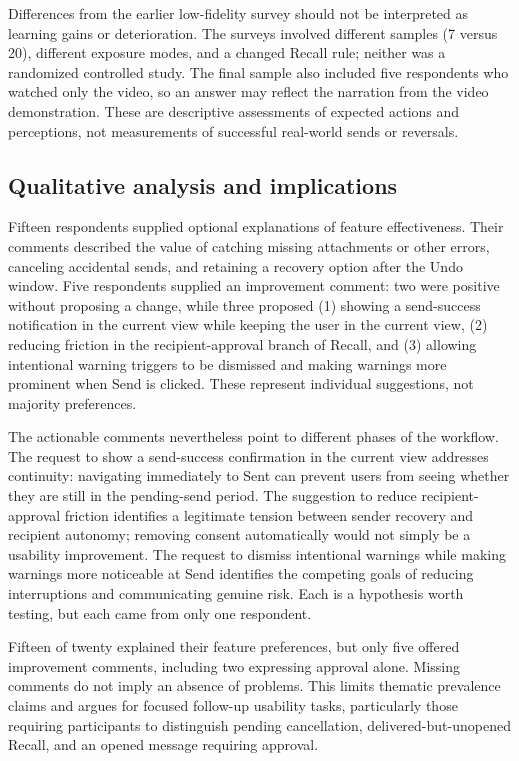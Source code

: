 \documentclass[letterpaper]{jdf}
\begin{document}
Differences from the earlier low-fidelity survey should not be interpreted as learning gains or deterioration. The surveys involved different samples (7 versus 20), different exposure modes, and a changed Recall rule; neither was a randomized controlled study. The final sample also included five respondents who watched only the video, so an answer may reflect the narration from the video demonstration. These are descriptive assessments of expected actions and perceptions, not measurements of successful real-world sends or reversals.

\subsection{Qualitative analysis and implications}
Fifteen respondents supplied optional explanations of feature effectiveness. Their comments described the value of catching missing attachments or other errors, canceling accidental sends, and retaining a recovery option after the Undo window. Five respondents supplied an improvement comment: two were positive without proposing a change, while three proposed (1) showing a send-success notification in the current view while keeping the user in the current view, (2) reducing friction in the recipient-approval branch of Recall, and (3) allowing intentional warning triggers to be dismissed and making warnings more prominent when Send is clicked. These represent individual suggestions, not majority preferences.

The actionable comments nevertheless point to different phases of the workflow. The request to show a send-success confirmation in the current view addresses continuity: navigating immediately to Sent can prevent users from seeing whether they are still in the pending-send period. The suggestion to reduce recipient-approval friction identifies a legitimate tension between sender recovery and recipient autonomy; removing consent automatically would not simply be a usability improvement. The request to dismiss intentional warnings while making warnings more noticeable at Send identifies the competing goals of reducing interruptions and communicating genuine risk. Each is a hypothesis worth testing, but each came from only one respondent.

Fifteen of twenty explained their feature preferences, but only five offered improvement comments, including two expressing approval alone. Missing comments do not imply an absence of problems. This limits thematic prevalence claims and argues for focused follow-up usability tasks, particularly those requiring participants to distinguish pending cancellation, delivered-but-unopened Recall, and an opened message requiring approval.
\end{document}
